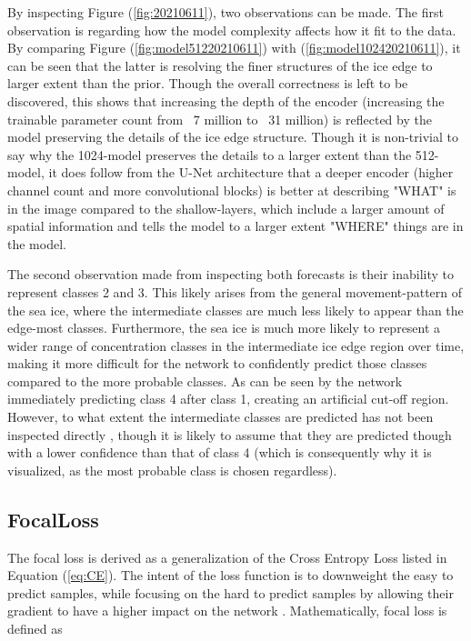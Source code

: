 \documentclass[../main/thesis]{subfiles}
\begin{document}
By inspecting Figure (\ref{fig:20210611}), two observations can be made. The first observation is regarding how the model complexity affects how it fit to the data. By comparing Figure (\ref{fig:model51220210611}) with (\ref{fig:model102420210611}), it can be seen that the latter is resolving the finer structures of the ice edge to larger extent than the prior. Though the overall correctness is left to be discovered, this shows that increasing the depth of the encoder (increasing the trainable parameter count from ~7 million to ~31 million) is reflected by the model preserving the details of the ice edge structure. Though it is non-trivial to say why the 1024-model preserves the details to a larger extent than the 512-model, it does follow from the U-Net architecture that a deeper encoder (higher channel count and more convolutional blocks) is better at describing "WHAT" is in the image compared to the shallow-layers, which include a larger amount of spatial information and tells the model to a larger extent "WHERE" things are in the model. 

The second observation made from inspecting both forecasts is their inability to represent classes 2 and 3. This likely arises from the general movement-pattern of the sea ice, where the intermediate classes are much less likely to appear than the edge-most classes. Furthermore, the sea ice is much more likely to represent a wider range of concentration classes in the intermediate ice edge region over time, making it more difficult for the network to confidently predict those classes compared to the more probable classes. As can be seen by the network immediately predicting class 4 after class 1, creating an artificial cut-off region. However, to what extent the intermediate classes are predicted has not been inspected directly , though it is likely to assume that they are predicted though with a lower confidence than that of class 4 (which is consequently why it is visualized, as the most probable class is chosen regardless).



\subsection{FocalLoss}
The focal loss is derived as a generalization of the Cross Entropy Loss listed in Equation (\ref{eq:CE}). The intent of the loss function is to downweight the easy to predict samples, while focusing on the hard to predict samples by allowing their gradient to have a higher impact on the network \cite{Lin2017}. Mathematically, focal loss is defined as
\end{document}
